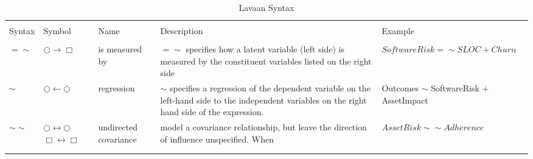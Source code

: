\begin{table}[!htbp] \centering 
	\caption{Lavaan Syntax} 
	\label{tab:model_lavaan_syntax} 
	\begin{small}
		\begin{tabular}{p{.75cm}p{1.25cm}p{2cm}p{5cm}p{4cm}} 
			&&&&\\[-1.8ex]\hline 
			\hline&&&& \\[-1.8ex] 
			Syntax & Symbol & Name & Description & Example \\ 
			\hline &&&&\\[-1.8ex]  
			$=\sim$	& $\bigcirc \rightarrow \Box$ & is measured by & $=\sim$ specifies how a latent variable (left side) is measured by the constituent variables listed on the right side & $SoftwareRisk =\sim SLOC + Churn$\\	
			 $\sim$ & $\bigcirc \leftarrow \bigcirc$ & regression & $\sim$ specifies a regression of the dependent variable on the left-hand side to the independent variables on the right hand side of the expression. & Outcomes $\sim$ SoftwareRisk $+$ AssetImpact  \\	
			 $\sim\sim$ & $\bigcirc \leftrightarrow \bigcirc$ $\Box \leftrightarrow \Box$ & undirected covariance & model a covariance relationship, but leave the direction of influence unspecified. When  & $AssetRisk \sim\sim Adherence$\\
			\hline &&&&\\[-1.8ex] 
			\hline &&&&\\[-1.8ex] 
		\end{tabular} 
	\end{small}
\end{table} 


